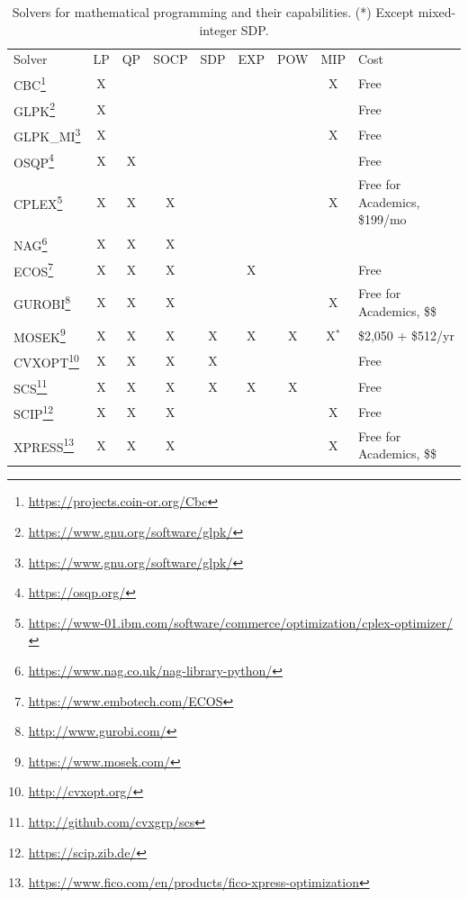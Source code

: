 \documentclass{article}
\begin{document}
\begin{table}
\centering
\begin{tabular}{l|c|c|c|c|c|c|c|l}
Solver & LP  & QP  & SOCP & SDP & EXP & POW & MIP & Cost \\
CBC\footnote{\url{https://projects.coin-or.org/Cbc}}                                                                          & X   &     &      &     &     &     & X   & Free \\
GLPK\footnote{\url{https://www.gnu.org/software/glpk/}}                                                                       & X   &     &      &     &     &     &     & Free \\
GLPK\_MI\footnote{\url{https://www.gnu.org/software/glpk/}}                                                                   & X   &     &      &     &     &     & X   & Free \\
OSQP\footnote{\url{https://osqp.org/}}                                                                                        & X   & X   &      &     &     &     &     & Free \\
CPLEX\footnote{\url{https://www-01.ibm.com/software/commerce/optimization/cplex-optimizer/}}                                  & X   & X   & X    &     &     &     & X   & Free for Academics, \$199/mo \\
NAG\footnote{\url{https://www.nag.co.uk/nag-library-python/}}                                                                 & X   & X   & X    &     &     &     &     & \\
ECOS\footnote{\url{https://www.embotech.com/ECOS}}                                                                            & X   & X   & X    &     & X   &     &     & Free \\
GUROBI\footnote{\url{http://www.gurobi.com/}}                                                                                 & X   & X   & X    &     &     &     & X   & Free for Academics, \$\$ \\
MOSEK\footnote{\url{https://www.mosek.com/}}                                                                                  & X   & X   & X    & X   & X   & X   & X$^*$ & \$2,050 + \$512/yr\\
CVXOPT\footnote{\url{http://cvxopt.org/}}                                                                                     & X   & X   & X    & X   &     &     &     & Free \\
SCS\footnote{\url{http://github.com/cvxgrp/scs}}                                                                              & X   & X   & X    & X   & X   & X   &     & Free \\
SCIP\footnote{\url{https://scip.zib.de/}}                                                                                     & X   & X   & X    &     &     &     & X   & Free \\
XPRESS\footnote{\url{https://www.fico.com/en/products/fico-xpress-optimization}}                                              & X   & X   & X    &     &     &     & X   & Free for Academics, \$\$ \\
\end{tabular}
\caption{Solvers for mathematical programming and their capabilities. (*) Except mixed-integer SDP.\label{tbl:solvers}}
\end{table}
\end{document}
